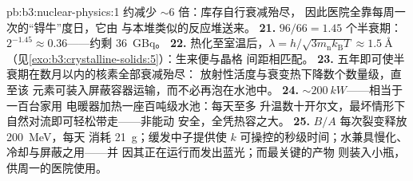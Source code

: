 \begin{solution}{pb:b3:nuclear-physics:1}
约减少 ${\sim}6$ 倍：库存自行衰减殆尽，
因此医院全靠每周一次的“锝牛”度日，它由
与本堆类似的反应堆送来。
\textbf{21.} $96/66 = 1.45$ 个半衰期：$2^{-1.45} \approx
0.36$——约剩 \qty{36}{GBq}。
\textbf{22.} 热化至室温后，$\lambda =
h/\sqrt{3m_{\text{n}}k_{\text{B}}T} \approx \qty{1.5}{\angstrom}$
（见\cref{exo:b3:crystalline-solids:5}）：生来便与晶格
间距相匹配。
\textbf{23.} 五年即可使半衰期在数月以内的核素全部衰减殆尽：
放射性活度与衰变热下降数个数量级，直至该
元素可装入屏蔽容器运输，而不必再泡在水池中。
\textbf{24.} ${\sim}\qty{200}{kW}$——相当于一百台家用
电暖器加热一座百吨级水池：每天至多
升温数十开尔文，最坏情形下自然对流即可轻松带走——非能动
安全，全凭热容之大。
\textbf{25.} $B/A$ 每次裂变释放 \qty{200}{MeV}，每天
消耗 \qty{21}{g}；缓发中子提供使 $k$
可操控的秒级时间；水兼具慢化、冷却与屏蔽之用——并
因其正在运行而发出蓝光；而最关键的产物
则装入小瓶，供周一的医院使用。
\end{solution}
